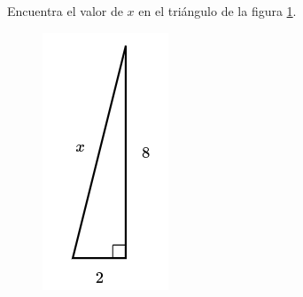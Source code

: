 Encuentra el valor de $x$ en el triángulo de la figura \ref{fig:lados_pitagoras_17}.

\begin{minipage}[t][][t]{0.3\textwidth}
    \begin{figure}[H]
        \centering
        \includegraphics[width=0.7\linewidth]{../images/lados_pitagoras_17.png}

        \caption{}
        \label{fig:lados_pitagoras_17}
    \end{figure}
\end{minipage}\hfill
